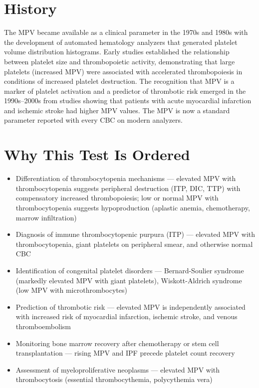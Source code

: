 \section*{History}
The MPV became available as a clinical parameter in the 1970s and 1980s with the development of automated hematology analyzers that generated platelet volume distribution histograms. Early studies established the relationship between platelet size and thrombopoietic activity, demonstrating that large platelets (increased MPV) were associated with accelerated thrombopoiesis in conditions of increased platelet destruction. The recognition that MPV is a marker of platelet activation and a predictor of thrombotic risk emerged in the 1990s--2000s from studies showing that patients with acute myocardial infarction and ischemic stroke had higher MPV values. The MPV is now a standard parameter reported with every CBC on modern analyzers.

\section*{Why This Test Is Ordered}
\begin{itemize}
  \item Differentiation of thrombocytopenia mechanisms --- elevated MPV with thrombocytopenia suggests peripheral destruction (ITP, DIC, TTP) with compensatory increased thrombopoiesis; low or normal MPV with thrombocytopenia suggests hypoproduction (aplastic anemia, chemotherapy, marrow infiltration)
  \item Diagnosis of immune thrombocytopenic purpura (ITP) --- elevated MPV with thrombocytopenia, giant platelets on peripheral smear, and otherwise normal CBC
  \item Identification of congenital platelet disorders --- Bernard-Soulier syndrome (markedly elevated MPV with giant platelets), Wiskott-Aldrich syndrome (low MPV with microthrombocytes)
  \item Prediction of thrombotic risk --- elevated MPV is independently associated with increased risk of myocardial infarction, ischemic stroke, and venous thromboembolism
  \item Monitoring bone marrow recovery after chemotherapy or stem cell transplantation --- rising MPV and IPF precede platelet count recovery
  \item Assessment of myeloproliferative neoplasms --- elevated MPV with thrombocytosis (essential thrombocythemia, polycythemia vera)
\end{itemize}

